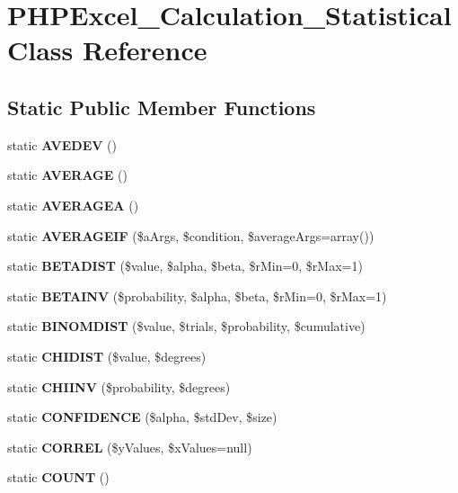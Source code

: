 \section{P\+H\+P\+Excel\+\_\+\+Calculation\+\_\+\+Statistical Class Reference}
\label{class_p_h_p_excel___calculation___statistical}
\subsection*{Static Public Member Functions}
\begin{DoxyCompactItemize}
\item 
static {\bfseries A\+V\+E\+D\+E\+V} ()\label{class_p_h_p_excel___calculation___statistical_a81f54874286d08a0fe5567ba181db106}

\item 
static {\bfseries A\+V\+E\+R\+A\+G\+E} ()\label{class_p_h_p_excel___calculation___statistical_aa0bdeecbec2bd1bfe81efd35aec58d2c}

\item 
static {\bfseries A\+V\+E\+R\+A\+G\+E\+A} ()\label{class_p_h_p_excel___calculation___statistical_aae53c9742d45ba38b8a12666221e138b}

\item 
static {\bfseries A\+V\+E\+R\+A\+G\+E\+I\+F} (\$a\+Args, \$condition, \$average\+Args=array())\label{class_p_h_p_excel___calculation___statistical_a6378d623e08a644327866956bad72460}

\item 
static {\bf B\+E\+T\+A\+D\+I\+S\+T} (\$value, \$alpha, \$beta, \$r\+Min=0, \$r\+Max=1)
\item 
static {\bf B\+E\+T\+A\+I\+N\+V} (\$probability, \$alpha, \$beta, \$r\+Min=0, \$r\+Max=1)
\item 
static {\bf B\+I\+N\+O\+M\+D\+I\+S\+T} (\$value, \$trials, \$probability, \$cumulative)
\item 
static {\bf C\+H\+I\+D\+I\+S\+T} (\$value, \$degrees)
\item 
static {\bf C\+H\+I\+I\+N\+V} (\$probability, \$degrees)
\item 
static {\bf C\+O\+N\+F\+I\+D\+E\+N\+C\+E} (\$alpha, \$std\+Dev, \$size)
\item 
static {\bf C\+O\+R\+R\+E\+L} (\$y\+Values, \$x\+Values=null)
\item 
static {\bfseries C\+O\+U\+N\+T} ()\label{class_p_h_p_excel___calculation___statistical_ad2a07df65e397b11dfb293be3e7d9de2}


\end{DoxyCompactItemize}
